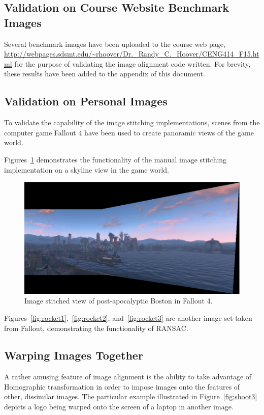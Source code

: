 \documentclass[12pt,journal,compsoc]{IEEEtran}
\begin{document}
\subsection{Validation on Course Website Benchmark Images}\label{sub:bench_1}
Several benchmark images have been uploaded to the course web page, {\url{http://webpages.sdsmt.edu/~rhoover/Dr._Randy_C._Hoover/CENG414_F15.html}} for the purpose of validating the image alignment code written. For brevity, these results have been added to the appendix of this document.

\subsection{Validation on Personal Images}\label{sub:bench_2}
To validate the capability of the image stitching implementations, scenes from the computer game Fallout 4 have been used to create panoramic views of the game world.


Figures~\ref{fig:castle1} demonstrates the functionality of the manual image stitching implementation on a skyline view in the game world.
 \begin{figure}[h]
	\centering
		  \centering
		  \includegraphics[width=1\linewidth]{img/castle1}
		  \caption{Image stitched view of post-apocalyptic Boston in Fallout 4.}
		  \label{fig:castle1}
\end{figure}

Figures~\ref{fig:rocket1},~\ref{fig:rocket2}, and~\ref{fig:rocket3} are another image set taken from Fallout, demonstrating the functionality of RANSAC.

\subsection{Warping Images Together}\label{sub:bench_3}
A rather amusing feature of image alignment is the ability to take advantage of Homographic transformation in order to impose images onto the features of other, dissimilar images. The particular example illustrated in Figure~\ref{fig:shoot3} depicts a logo being warped onto the screen of a laptop in another image.
\end{document}
